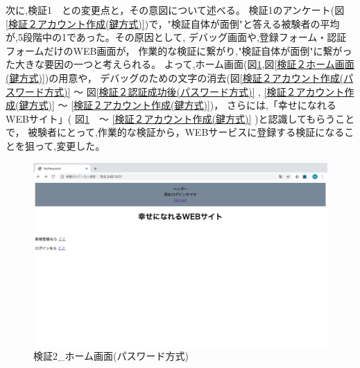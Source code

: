     次に,検証1　との変更点と，その意図について述べる。
    検証1のアンケート(図\ref{検証２アカウント作成(鍵方式)})で，"検証自体が面倒"と答える被験者の平均が,5段階中の1であった。その原因として,
    デバッグ画面や,登録フォーム・認証フォームだけのWEB画面が，
    作業的な検証に繋がり,"検証自体が面倒"に繋がった大きな要因の一つと考えられる。
    よって,ホーム画面(図\ref{検証２ホーム画面(パスワード方式)},図\ref{検証２ホーム画面(鍵方式)})の用意や，
    デバッグのための文字の消去(図\ref{検証２アカウント作成(パスワード方式)} 〜 図\ref{検証２認証成功後(パスワード方式)} , \ref{検証２アカウント作成(鍵方式)} 〜 \ref{検証２アカウント作成(鍵方式)})，
    さらには,「幸せになれるWEBサイト」( 図\ref{検証２ホーム画面(パスワード方式)}　〜 \ref{検証２アカウント作成(鍵方式)} )と認識してもらうことで，
    被験者にとって,作業的な検証から，WEBサービスに登録する検証になることを狙って,変更した。









    \vspace{4cm}%
    \begin{figure}[H]
        \includegraphics[width=15cm]{./fig/chapter4/inspect_2/password_screnn/home.png}
        \caption{検証2\_ホーム画面(パスワード方式)}
        \label{検証２ホーム画面(パスワード方式)}
    \end{figure}


